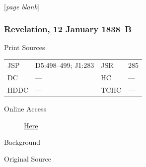 					[\textit{page blank}]

		\subsubsection{Revelation, 12 January 1838--B}
			\label{EMS-1838-JS-12-JAN-1838-B}
			
			\begin{description}
					\item[Print Sources]
				\end{description}

					\begin{tabular}{p{0.5in}p{1in}p{0.5in}p{1in}}
					JSP	 	& D5:498--499; J1:283		& JSR 		& 285 \\
					DC	 	& ---		& HC 		& --- \\
					HDDC 	& ---		& TCHC 		& --- \\
					\end{tabular}
				
				\begin{description}
					\item[Online Access] \href{https://www.josephsmithpapers.org/paper-summary/revelation-12-january-1838-b/1}{Here}
				\end{description}
				
				\begin{description}
					\item[Background]
				\end{description}
				
				
				\begin{description}
					\item[Original Source]
				\end{description}
				
				
